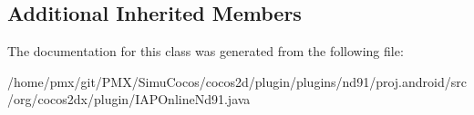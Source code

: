 \subsection*{Additional Inherited Members}


The documentation for this class was generated from the following file\+:\begin{DoxyCompactItemize}
\item 
/home/pmx/git/\+P\+M\+X/\+Simu\+Cocos/cocos2d/plugin/plugins/nd91/proj.\+android/src/org/cocos2dx/plugin/I\+A\+P\+Online\+Nd91.\+java\end{DoxyCompactItemize}
